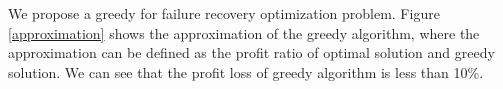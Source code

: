 \documentclass[sigconf]{acmart}
\begin{document}
We propose a greedy for failure recovery optimization problem.
Figure \ref{approximation} shows the approximation of the greedy algorithm, where the approximation can be defined as the profit ratio of optimal solution and greedy solution.
We can see that the profit loss of greedy algorithm is less than 10\%.
\end{document}
